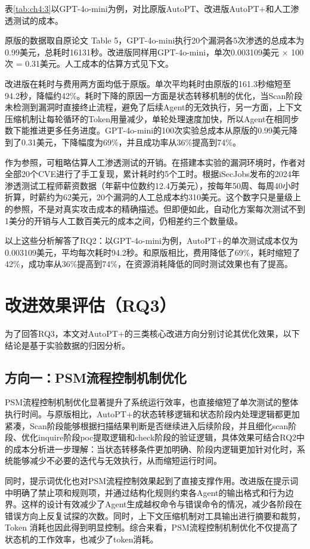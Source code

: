表\ref{tab:ch4:3}以GPT-4o-mini为例，对比原版AutoPT、改进版AutoPT+和人工渗透测试的成本。

原版的数据取自原论文\cite{Wu2024AutoPT} Table 5，GPT-4o-mini执行20个漏洞各5次渗透的总成本为0.99美元，总耗时16131秒。改进版同样用GPT-4o-mini，单次0.003109美元 × 100次 = 0.31美元。人工成本的估算方式见下文。

改进版在耗时与费用两方面均低于原版。单次平均耗时由原版的161.3秒缩短至94.2秒，降幅约42\%。耗时下降的原因一方面是状态转移机制的优化，当Scan阶段未检测到漏洞时直接终止流程，避免了后续Agent的无效执行，另一方面，上下文压缩机制让每轮循环的Token用量减少，单轮处理速度加快，所以Agent在相同步数下能推进更多任务进度。GPT-4o-mini的100次实验总成本从原版的0.99美元降到了0.31美元，下降幅度为69\%，并且成功率从36\%提高到74\%。

作为参照，可粗略估算人工渗透测试的开销。在搭建本实验的漏洞环境时，作者对全部20个CVE进行了手工复现，累计耗时约5个工时。根据iSecJobs发布的2024年渗透测试工程师薪资数据（年薪中位数约12.4万美元），按每年50周、每周40小时折算，时薪约为62美元，20个漏洞的人工总成本约310美元。这个数字只是量级上的参照，不是对真实攻击成本的精确描述。但即便如此，自动化方案每次测试不到1美分的开销与人工数百美元的成本之间，仍相差约三个数量级。

以上这些分析解答了RQ2：以GPT-4o-mini为例，AutoPT+的单次测试成本仅为0.003109美元，平均每次耗时94.2秒。和原版相比，费用降低了69\%，耗时缩短了42\%，成功率从36\%提高到74\%，在资源消耗降低的同时测试效果也有了提高。

\section{改进效果评估（RQ3）}

为了回答RQ3，本文对AutoPT+的三类核心改进方向分别讨论其优化效果，以下结论是基于实验数据的归因分析。

\subsection{方向一：PSM流程控制机制优化}

PSM流程控制机制优化显著提升了系统运行效率，也直接缩短了单次测试的整体执行时间。与原版相比，AutoPT+的状态转移逻辑和状态阶段内处理逻辑都更加紧凑，Scan阶段能够根据扫描结果判断是否继续进入后续阶段，并且细化scan阶段、优化inquire阶段poc提取逻辑和check阶段的验证逻辑，具体效果可结合RQ2中的成本分析进一步理解：当状态转移条件更加明确、阶段内逻辑更加针对化时，系统能够减少不必要的迭代与无效执行，从而缩短运行时间。

同时，提示词优化也对PSM流程控制效果起到了直接支撑作用。改进版在提示词中明确了禁止项和规则项，并通过结构化规则约束各Agent的输出格式和行为边界。这样的设计有效减少了Agent生成越权命令与错误命令的情况，减少各阶段在错误方向上反复试探的次数。同时，上下文压缩机制对工具输出进行摘要和裁剪，Token 消耗也因此得到明显控制。综合来看，PSM流程控制机制优化不仅提高了状态机的工作效率，也减少了token消耗。

